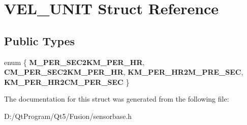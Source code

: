 \hypertarget{struct_v_e_l___u_n_i_t}{}\section{V\+E\+L\+\_\+\+U\+N\+I\+T Struct Reference}
\label{struct_v_e_l___u_n_i_t}
\subsection*{Public Types}
\begin{DoxyCompactItemize}
\item 
\hypertarget{struct_v_e_l___u_n_i_t_a112b0af37f7da59c85ba1ce87d1f4b9d}{}enum \{ {\bfseries M\+\_\+\+P\+E\+R\+\_\+\+S\+E\+C2\+K\+M\+\_\+\+P\+E\+R\+\_\+\+H\+R}, 
{\bfseries C\+M\+\_\+\+P\+E\+R\+\_\+\+S\+E\+C2\+K\+M\+\_\+\+P\+E\+R\+\_\+\+H\+R}, 
{\bfseries K\+M\+\_\+\+P\+E\+R\+\_\+\+H\+R2\+M\+\_\+\+P\+R\+E\+\_\+\+S\+E\+C}, 
{\bfseries K\+M\+\_\+\+P\+E\+R\+\_\+\+H\+R2\+C\+M\+\_\+\+P\+E\+R\+\_\+\+S\+E\+C}
 \}\label{struct_v_e_l___u_n_i_t_a112b0af37f7da59c85ba1ce87d1f4b9d}

\end{DoxyCompactItemize}


The documentation for this struct was generated from the following file\+:\begin{DoxyCompactItemize}
\item 
D\+:/\+Qt\+Program/\+Qt5/\+Fusion/sensorbase.\+h\end{DoxyCompactItemize}
